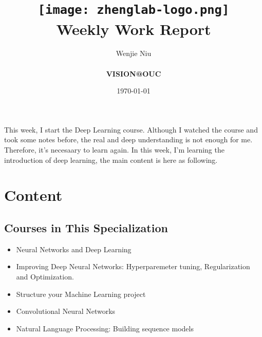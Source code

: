 \documentclass[a4paper]{article}
\title{
    \vspace*{1in}
    \texttt{[image: zhenglab-logo.png]} \\
    \vspace*{1.2in}
    \textbf{\huge Weekly Work Report}
    \vspace{0.2in}
}
\author{Wenjie Niu \\
    \vspace*{0.5in} \\
    \textbf{VISION@OUC} \\
    \vspace*{1in}
}
\date{\today}
\begin{document}
\maketitle
\setcounter{page}{0}
\thispagestyle{empty}
\newpage

This week, I start the Deep Learning course. Although I watched the course and took some notes before, the real and deep understanding is not enough for me. Therefore, it's necesaary to learn again. In this week, I'm learning the introduction of deep learning, the main content is here as following.\par

\section{Content}
\subsection{Courses in This Specialization}
\begin{itemize}
\item Neural Networks and  Deep Learning
\item Improving Deep Neural Networks: Hyperparemeter tuning, Regularization and Optimization.
\item Structure your Machine Learning project
\item Convolutional Neural Networks
\item Natural Language Processing: Building sequence models
\end{itemize}
\end{document}
